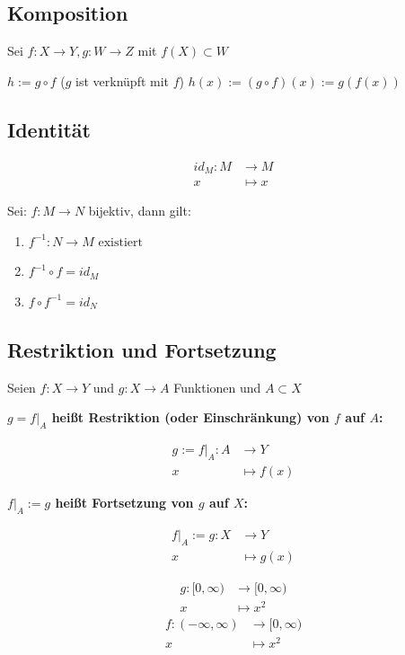 \documentclass[fleqn]{scrbook}
\newenvironment{example}{{\bfseries Beispiel }}{}
\begin{document}
\subsection{Komposition}

Sei $f : X \to Y, g : W \to Z$ mit $f(X) \subset W$

$h:= g \circ f$ ($g$ ist verknüpft mit $f$)
$h(x):= (g \circ f)(x):=g(f(x))$

\subsection{Identität}

\begin{align*}
  id_M : M & \to     M\\
              x & \mapsto x
\end{align*}

Sei: $f : M \to N$ bijektiv, dann gilt:

\begin{enumerate}
 \item $f^{-1} : N \to M \text{ existiert} $
 \item $f^{-1} \circ f = id_M$
 \item $f \circ f^{-1} = id_N$
\end{enumerate}

\subsection{Restriktion und Fortsetzung}

Seien $f : X \to Y$ und $g : X \to A$ Funktionen und $A \subset X$

\textbf{$g=f|_A$ heißt Restriktion (oder Einschränkung) von $f$ auf $A$:}

\begin{align*}
  g := f|_A : A & \to     Y\\
                   x & \mapsto f(x)
\end{align*}

\textbf{$f|_A := g$ heißt Fortsetzung von $g$ auf $X$:}

\begin{align*}
  f|_A := g : X & \to     Y\\
                   x & \mapsto g(x)
\end{align*}

\begin{example}
\begin{align*}
  g : [0,\infty) & \to     [0,\infty)\\
                    x & \mapsto x^2
\end{align*}
\begin{align*}
  f : (-\infty,\infty) & \to     [0,\infty)\\
                          x & \mapsto x^2
\end{align*}
\end{example}
\end{document}
